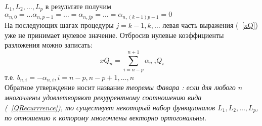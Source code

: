 $L_1,L_2,\ldots,L_p$ в результате получим
$\alpha_{n,0}=\ldots\alpha_{n,p-1}=\ldots=\alpha_{n,jp}=\ldots=\alpha_{n,(k-1)p-1}=0$ \\
На последующих шагах процедуры $j=k-1,k,\ldots$ левая часть
выражения (~\ref{xQ}) уже не принимает нулевое значение. Отбросив
нулевые коэффициенты разложения можно записать:
$$
xQ_n=\sum\limits_{i=n-p}^{n+1}{\alpha_{n,i}Q_i}
$$
т.е. $b_{n,i}=-\alpha_{n,i},i=n-p,n-p+1,\ldots,n$ \\ Обратное
утверждение носит название \it теоремы Фавара \rm : если для
любого $n$ многочлены удовлетворяют рекуррентному соотношению вида
(~\ref{QRecurrrence}), то существует некоторый набор функционалов
$L_1,L_2,\ldots,L_p$, по отношению к которому многочлены векторно
ортогональны.\\ \\

